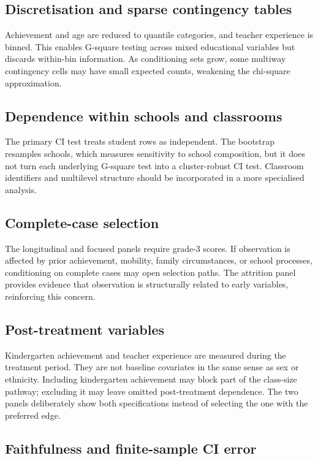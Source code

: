 \documentclass[11pt,a4paper,oneside]{report}
\begin{document}
\subsection{Discretisation and sparse contingency tables}

Achievement and age are reduced to quantile categories, and teacher
experience is binned. This enables G-square testing across mixed educational
variables but discards within-bin information. As conditioning sets grow,
some multiway contingency cells may have small expected counts, weakening
the chi-square approximation.

\subsection{Dependence within schools and classrooms}

The primary CI test treats student rows as independent. The bootstrap
resamples schools, which measures sensitivity to school composition, but it
does not turn each underlying G-square test into a cluster-robust CI test.
Classroom identifiers and multilevel structure should be incorporated in a
more specialised analysis.

\subsection{Complete-case selection}

The longitudinal and focused panels require grade-3 scores. If observation is
affected by prior achievement, mobility, family circumstances, or school
processes, conditioning on complete cases may open selection paths. The
attrition panel provides evidence that observation is structurally related to
early variables, reinforcing this concern.

\subsection{Post-treatment variables}

Kindergarten achievement and teacher experience are measured during the
treatment period. They are not baseline covariates in the same sense as sex or
ethnicity. Including kindergarten achievement may block part of the
class-size pathway; excluding it may leave omitted post-treatment dependence.
The two panels deliberately show both specifications instead of selecting the
one with the preferred edge.

\subsection{Faithfulness and finite-sample CI error}
\end{document}
